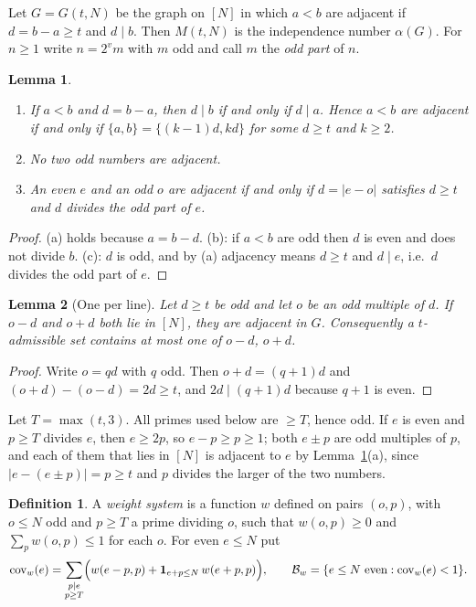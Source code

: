 \documentclass[11pt]{amsart}
\newtheorem{lemma}{Lemma}[section]
\theoremstyle{definition}
\newtheorem*{definition*}{Definition}
\theoremstyle{remark}
\newcommand{\cov}{\operatorname{cov}}
\newcommand{\Bad}{\mathcal{B}}
\begin{document}
Let $G=G(t,N)$ be the graph on $[N]$ in which $a<b$ are adjacent if $d=b-a\ge t$ and $d\mid b$. Then $M(t,N)$ is the independence number $\alpha(G)$. For $n\ge1$ write $n=2^v m$ with $m$ odd and call $m$ the \emph{odd part} of $n$.

\begin{lemma}\label{lem:graph}
\begin{enumerate}
\item[(a)] If $a<b$ and $d=b-a$, then $d\mid b$ if and only if $d\mid a$. Hence $a<b$ are adjacent if and only if $\{a,b\}=\{(k-1)d,kd\}$ for some $d\ge t$ and $k\ge2$.
\item[(b)] No two odd numbers are adjacent.
\item[(c)] An even $e$ and an odd $o$ are adjacent if and only if $d=|e-o|$ satisfies $d\ge t$ and $d$ divides the odd part of $e$.
\end{enumerate}
\end{lemma}

\begin{proof}
(a) holds because $a=b-d$. (b): if $a<b$ are odd then $d$ is even and does not divide $b$. (c): $d$ is odd, and by (a) adjacency means $d\ge t$ and $d\mid e$, i.e.\ $d$ divides the odd part of $e$.
\end{proof}

\begin{lemma}[One per line]\label{lem:line}
Let $d\ge t$ be odd and let $o$ be an odd multiple of $d$. If $o-d$ and $o+d$ both lie in $[N]$, they are adjacent in $G$. Consequently a $t$-admissible set contains at most one of $o-d$, $o+d$.
\end{lemma}

\begin{proof}
Write $o=qd$ with $q$ odd. Then $o+d=(q+1)d$ and $(o+d)-(o-d)=2d\ge t$, and $2d\mid(q+1)d$ because $q+1$ is even.
\end{proof}

Let $T=\max(t,3)$. All primes used below are $\ge T$, hence odd. If $e$ is even and $p\ge T$ divides $e$, then $e\ge 2p$, so $e-p\ge p\ge1$; both $e\pm p$ are odd multiples of $p$, and each of them that lies in $[N]$ is adjacent to $e$ by Lemma~\ref{lem:graph}(a), since $|e-(e\pm p)|=p\ge t$ and $p$ divides the larger of the two numbers.

\begin{definition*}
A \emph{weight system} is a function $w$ defined on pairs $(o,p)$, with $o\le N$ odd and $p\ge T$ a prime dividing $o$, such that $w(o,p)\ge0$ and $\sum_{p}w(o,p)\le1$ for each $o$. For even $e\le N$ put
\[
\cov_w(e)=\sum_{\substack{p\mid e\\ p\ge T}}\Bigl(w(e-p,p)+\mathbf 1_{e+p\le N}\,w(e+p,p)\Bigr),
\qquad
\Bad_w=\{e\le N\text{ even}:\cov_w(e)<1\}.
\]
\end{definition*}
\end{document}
